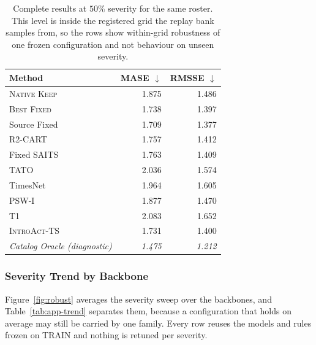 \documentclass{article}
\newcommand{\oracle}[1]{\textit{\textcolor{phgray}{#1}}}
\newcommand{\introact}{\textsc{IntroAct-TS}}
\begin{document}
\begin{table}[!t]
  \caption{Complete results at $50\%$ severity for the same roster. This level is inside the registered grid the replay bank samples from, so the rows show within-grid robustness of one frozen configuration and not behaviour on unseen severity.}
  \label{tab:app-sev50}
  \centering
  \small
  \setlength{\tabcolsep}{4pt}
\begin{tabular*}{\textwidth}{@{\extracolsep{\fill}}lrr@{}}
    \toprule
    Method & MASE $\downarrow$ & RMSSE $\downarrow$ \\
    \midrule
    \textsc{Native Keep} & 1.875 & 1.486 \\
    \textsc{Best Fixed} & 1.738 & 1.397 \\
    Source Fixed & 1.709 & 1.377 \\
    R2-CART & 1.757 & 1.412 \\
    Fixed SAITS & 1.763 & 1.409 \\
    TATO & 2.036 & 1.574 \\
    TimesNet & 1.964 & 1.605 \\
    PSW-I & 1.877 & 1.470 \\
    T1 & 2.083 & 1.652 \\
    \midrule
    \rowcolor{bestgray}\introact{} & 1.731 & 1.400 \\
    \midrule
    \oracle{Catalog Oracle (diagnostic)} & \oracle{1.475} & \oracle{1.212} \\
    \bottomrule
  \end{tabular*}
\end{table}

\subsubsection{Severity Trend by Backbone}
\label{app:robust-fig}
Figure~\ref{fig:robust} averages the severity sweep over the backbones, and
Table~\ref{tab:app-trend} separates them, because a configuration that holds on average may
still be carried by one family. Every row reuses the models and rules frozen on TRAIN and
nothing is retuned per severity.
\end{document}
